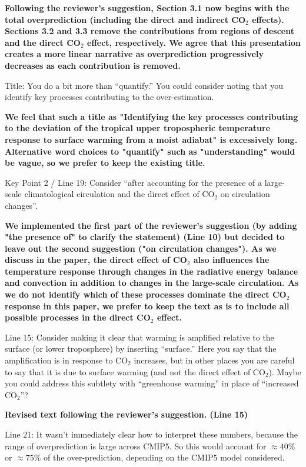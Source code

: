 \documentclass[11pt]{article}
\begin{document}
\textbf{Following the reviewer's suggestion, Section 3.1 now begins with the total overprediction (including the direct and indirect CO$_2$ effects). Sections 3.2 and 3.3 remove the contributions from regions of descent and the direct CO$_2$ effect, respectively. We agree that this presentation creates a more linear narrative as overprediction progressively decreases as each contribution is removed.}

Title: You do a bit more than ``quantify.'' You could consider noting that you identify key processes contributing to the over-estimation.

\textbf{We feel that such a title as "Identifying the key processes contributing to the deviation of the tropical upper tropospheric temperature response to surface warming from a moist adiabat" is excessively long. Alternative word choices to "quantify" such as "understanding" would be vague, so we prefer to keep the existing title.}

Key Point 2 / Line 19: Consider ``after accounting for the presence of a large-scale climatological circulation and the direct effect of CO\(_2\) on circulation changes''.

\textbf{We implemented the first part of the reviewer's suggestion (by adding "the presence of" to clarify the statement) (Line 10) but decided to leave out the second suggestion ("on circulation changes"). As we discuss in the paper, the direct effect of CO\(_2\) also influences the temperature response through changes in the radiative energy balance and convection in addition to changes in the large-scale circulation. As we do not identify which of these processes dominate the direct CO\(_2\) response in this paper, we prefer to keep the text as is to include all possible processes in the direct CO\(_2\) effect.}

Line 15: Consider making it clear that warming is amplified relative to the surface (or lower troposphere) by inserting ``surface.'' Here you say that the amplification is in response to CO\(_2\) increases, but in other places you are careful to say that it is due to surface warming (and not the direct effect of CO\(_2\)). Maybe you could address this subtlety with ``greenhouse warming'' in place of ``increased CO\(_2\)''?

\textbf{Revised text following the reviewer's suggestion. (Line 15)}

Line 21: It wasn't immediately clear how to interpret these numbers, because the range of overprediction is large across CMIP5. So this would account for \(\approx40\%\) or \(\approx75\%\) of the over-prediction, depending on the CMIP5 model considered.
\end{document}

